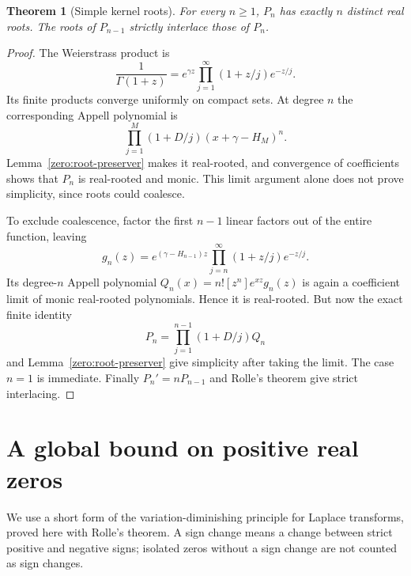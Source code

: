 \documentclass[11pt,a4paper]{article}
\newtheorem{theorem}{Theorem}[section]
\theoremstyle{definition}
\theoremstyle{remark}
\numberwithin{equation}{section}
\begin{document}
\begin{theorem}[Simple kernel roots]\label{zero:roots}
For every $n\geq1$, $P_n$ has exactly $n$ distinct real roots.
The roots of $P_{n-1}$ strictly interlace those of $P_n$.
\end{theorem}
\begin{proof}
The Weierstrass product \cite{DLMF5} is
\[
 \frac1{\Gamma(1+z)}
   =e^{\gamma z}\prod_{j=1}^{\infty}(1+z/j)e^{-z/j}.
\]
Its finite products converge uniformly on compact sets.  At degree $n$
the corresponding Appell polynomial is
\[
 \prod_{j=1}^{M}(1+D/j)(x+\gamma-H_M)^n.
\]
Lemma~\ref{zero:root-preserver} makes it real-rooted, and convergence
of coefficients shows that $P_n$ is real-rooted and monic.  This limit
argument alone does not prove simplicity, since roots could coalesce.

To exclude coalescence, factor the first $n-1$ linear factors out of
the entire function, leaving
\[
 g_n(z)=e^{(\gamma-H_{n-1})z}
             \prod_{j=n}^{\infty}(1+z/j)e^{-z/j}.
\]
Its degree-$n$ Appell polynomial $Q_n(x)=n![z^n]e^{xz}g_n(z)$ is
again a coefficient limit of monic real-rooted polynomials.  Hence it
is real-rooted.  But now the exact finite identity
\[
 P_n=\prod_{j=1}^{n-1}(1+D/j)Q_n
\]
and Lemma~\ref{zero:root-preserver} give simplicity after taking
the limit.  The case $n=1$ is immediate.  Finally
$P_n'=nP_{n-1}$ and Rolle's theorem give strict interlacing.
\end{proof}

\section{A global bound on positive real zeros}
\label{zero:count-section}

We use a short form of the variation-diminishing principle for Laplace
transforms, proved here with Rolle's theorem.  A sign change means a
change between strict positive and negative signs; isolated zeros
without a sign change are not counted as sign changes.
\end{document}

